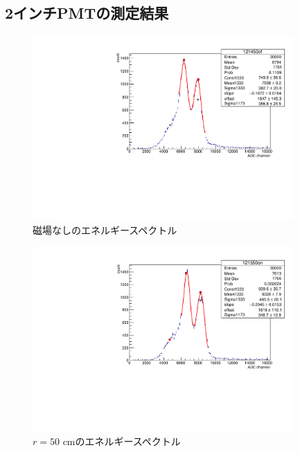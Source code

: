 


 
\subsection{2インチPMTの測定結果}\label{noFe}

\begin{figure}[tbp]
	\centering
	\includegraphics[angle=-90,width=10cm]{fig/iguchi/121450of.pdf}
	\caption{磁場なしのエネルギースペクトル}
	\label{histoff}
\end{figure}

\begin{figure}[tbp]
	\centering
	\includegraphics[angle=-90,width=10cm]{fig/iguchi/121550on.pdf}
	\caption{$r=50$ cmのエネルギースペクトル}
	\label{hist50}
\end{figure}

